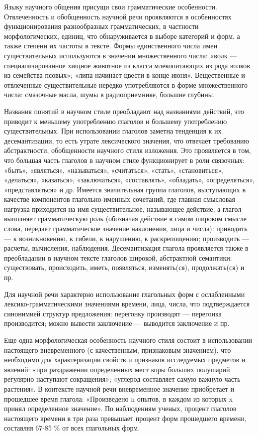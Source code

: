\documentclass[12pt]{llncs}
\begin{document}
Языку научного общения присущи свои грамматические особенности. Отвлеченность и обобщенность научной речи проявляются в особенностях функционирования разнообразных грамматических, в частности морфологических, единиц, что обнаруживается в выборе категорий и форм, а также степени их частоты в тексте. Формы единственного числа имен существительных используются в значении множественного числа: «волк — специализированное хищное животное из класса млекопитающих из рода волков из семейства псовых»; «липа начинает цвести в конце июня». Вещественные и отвлеченные существительные нередко употребляются в форме множественного числа: смазочные масла, шумы в радиоприемнике, большие глубины.

Названия понятий в научном стиле преобладают над названиями действий, это приводит к меньшему употреблению глаголов и большему употреблению существительных. При использовании глаголов заметна тенденция к их десемантизации, то есть утрате лексического значения, что отвечает требованию абстрактности, обобщенности научного стиля изложения. Это проявляется в том, что большая часть глаголов в научном стиле функционирует в роли связочных: «быть», «являться», «называться», «считаться», «стать», «становиться», «делаться», «казаться», «заключаться», «составлять», «обладать», «определяться», «представляться» и др. Имеется значительная группа глаголов, выступающих в качестве компонентов глагольно-именных сочетаний, где главная смысловая нагрузка приходится на имя существительное, называющее действие, а глагол выполняет грамматическую роль (обозначая действие в самом широком смысле слова, передает грамматическое значение наклонения, лица и числа): приводить — к возникновению, к гибели, к нарушению, к раскрепощению; производить — расчеты, вычисления, наблюдения. Десемантизация глагола проявляется также в преобладании в научном тексте глаголов широкой, абстрактной семантики: существовать, происходить, иметь, появляться, изменять(ся), продолжать(ся) и пр.

Для научной речи характерно использование глагольных форм с ослабленными лексико-грамматическими значениями времени, лица, числа, что подтверждается синонимией структур предложения: перегонку производят — перегонка производится; можно вывести заключение — выводится заключение и пр.

Еще одна морфологическая особенность научного стиля состоит в использовании настоящего вневременного (с качественным, признаковым значением), что необходимо для характеризации свойств и признаков исследуемых предметов и явлений: «при раздражении определенных мест коры больших полушарий регулярно наступают сокращения»; «углерод составляет самую важную часть растения». В контексте научной речи вневременное значение приобретает и прошедшее время глагола: «Произведено n опытов, в каждом из которых x принял определенное значение». По наблюдениям ученых, процент глаголов настоящего времени в три раза превышает процент форм прошедшего времени, составляя 67-85 \% от всех глагольных форм.
\end{document}
